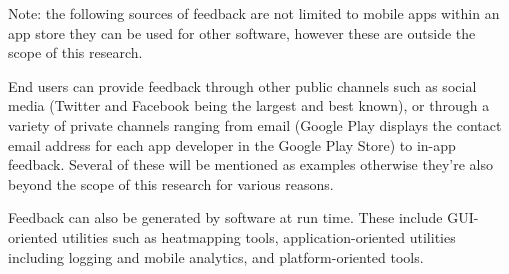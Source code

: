 Note: the following sources of feedback are not limited to mobile apps within an app store they can be used for other software, however these are outside the scope of this research.

End users can provide feedback through other public channels such as social media (Twitter and Facebook being the largest and best known), or through a variety of private channels ranging from email (Google Play displays the contact email address for each app developer in the Google Play Store) to in-app feedback. Several of these will be mentioned as examples otherwise they're also beyond the scope of this research for various reasons. 

Feedback can also be generated by software at run time. These include GUI-oriented utilities such as heatmapping tools, application-oriented utilities including logging and mobile analytics, and platform-oriented tools.



